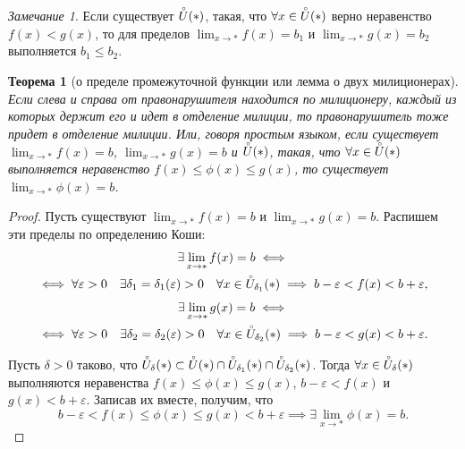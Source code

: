 \documentclass[a4paper,12pt]{article} %
\newtheorem{theorem}{Теорема}[section]
\theoremstyle{remark}
\newtheorem*{remark}{Замечание}
\theoremstyle{definition}
\begin{document}
\begin{remark}
	Если существует $\accentset{\circ}{U}(*)$, такая, что $\forall x \in  \accentset{\circ}{U}(*)$ верно неравенство $f(x) < g(x)$, то для пределов $\lim_{x \to *} f(x) = b_1$ и $\lim_{x \to *} g(x) = b_2$ выполняется $b_1\le b_2$.
\end{remark}

\begin{theorem}[о пределе промежуточной функции или лемма о двух милиционерах]
	Если слева и справа от правонарушителя находится по милиционеру, каждый из которых держит его и идет в отделение милиции, то правонарушитель тоже придет в отделение милиции. Или, говоря простым языком, если существует $\lim_{x \to *} f(x) = b$, $\lim_{x \to *} g(x) = b$ и $\accentset{\circ}{U}(*)$, такая, что $\forall x\in \accentset{\circ}{U}(*)$ выполняется неравенство $f(x) \le \phi(x) \le g(x)$, то существует $\lim_{x \to *} \phi(x) = b$.
\end{theorem}
\begin{proof}
	Пусть существуют $\lim_{x \to *} f(x) = b$ и $\lim_{x \to *} g(x) = b$. Распишем эти пределы по определению Коши:
	\begin{multline}
		\exists \lim_{x \to *} f(x) = b \iff \\
		\iff \forall \varepsilon>0 \quad \exists \delta_1 = \delta_1(\varepsilon) > 0 \quad \forall x\in \accentset{\circ}{U}_{\delta_1}(*) \implies b-\varepsilon < f(x) < b + \varepsilon,
	\end{multline}
	\begin{multline}
		\exists \lim_{x \to *} g(x) = b \iff \\
		\iff \forall \varepsilon>0 \quad \exists \delta_2 = \delta_2(\varepsilon) > 0 \quad \forall x\in \accentset{\circ}{U}_{\delta_2}(*) \implies b-\varepsilon < g(x) < b + \varepsilon.
	\end{multline}

	Пусть $\delta>0$ таково, что $\accentset{\circ}{U}_\delta(*) \subset \accentset{\circ}{U}(*)\cap \accentset{\circ}{U}_{\delta_1}(*) \cap \accentset{\circ}{U}_{\delta_2}(*)$. Тогда $\forall x \in \accentset{\circ}{U}_\delta(*)$ выполняются неравенства
	$f(x) \le \phi(x) \le g(x)$, $b-\varepsilon < f(x)$ и $g(x) < b + \varepsilon$.
	Записав их вместе, получим, что
	\[
	b - \varepsilon < f(x) \le \phi(x) \le g(x) < b + \varepsilon \implies \exists \lim_{x \to *} \phi(x) = b
	.\] 
\end{proof}
\end{document}
